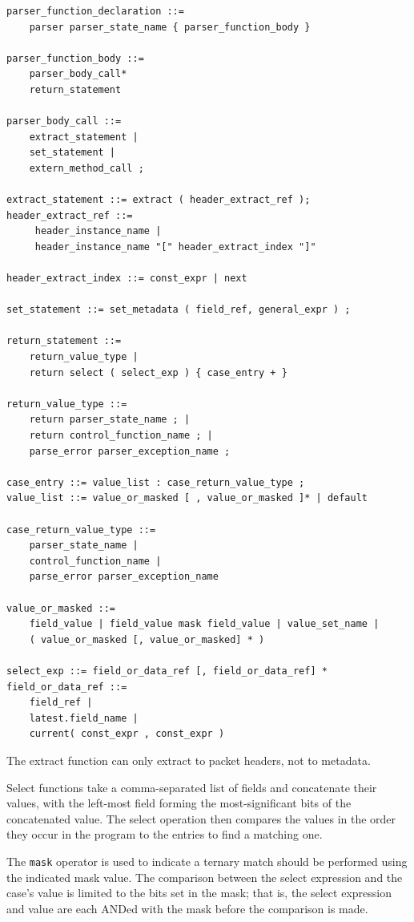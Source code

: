 \documentclass[12pt]{article}
\begin{document}
\begin{lstlisting}[style=BNFstyle]
parser_function_declaration ::=
    parser parser_state_name { parser_function_body }

parser_function_body ::=
    parser_body_call*
    return_statement

parser_body_call ::=
    extract_statement |
    set_statement |
    extern_method_call ;

extract_statement ::= extract ( header_extract_ref ); 
header_extract_ref ::=
     header_instance_name |
     header_instance_name "[" header_extract_index "]"

header_extract_index ::= const_expr | next

set_statement ::= set_metadata ( field_ref, general_expr ) ;

return_statement ::=
    return_value_type |
    return select ( select_exp ) { case_entry + }

return_value_type ::= 
    return parser_state_name ; | 
    return control_function_name ; | 
    parse_error parser_exception_name ;

case_entry ::= value_list : case_return_value_type ;
value_list ::= value_or_masked [ , value_or_masked ]* | default

case_return_value_type ::= 
    parser_state_name | 
    control_function_name | 
    parse_error parser_exception_name

value_or_masked ::=
    field_value | field_value mask field_value | value_set_name |
    ( value_or_masked [, value_or_masked] * )
 
select_exp ::= field_or_data_ref [, field_or_data_ref] * 
field_or_data_ref ::=
    field_ref |
    latest.field_name |
    current( const_expr , const_expr )
\end{lstlisting}

The extract function can only extract to packet headers, not to metadata.

Select functions take a comma-separated list of fields and concatenate their 
values, with the left-most field forming the most-significant bits of the 
concatenated value.  The select operation then compares the values in the 
order they occur in the program to the entries to find a matching one.

The \texttt{mask} operator is used to indicate a ternary match should be performed 
using the indicated mask value. The comparison between the select expression 
and the case's value is limited to the bits set in the mask; that is, the 
select expression and value are each ANDed with the mask before the comparison 
is made. 
\end{document}
